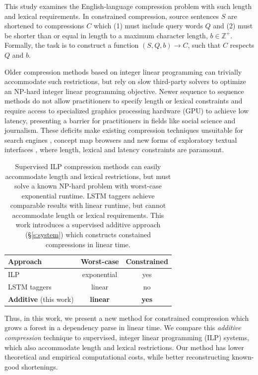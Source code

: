 \documentclass[11pt,a4paper]{article}
\begin{document}
This study examines the English-language compression problem with such length and lexical requirements. In constrained compression, source sentences $S$ are shortened to compressions $C$ which (1) must include query words $Q$ and (2) must be shorter than or equal in length to a maximum character length, $b \in \mathbb{Z}^{+}$. Formally, the task is to construct a function $(S,Q,b) \rightarrow C$, such that $C$ respects $Q$ and $b$.

Older compression methods  \cite{clarke2008global,filippova2013overcoming} based on integer linear programming can trivially accommodate such restrictions, but rely on slow third-party solvers to optimize an NP-hard integer linear programming objective\label{s:relatedwork}. Newer sequence to sequence methods \cite{filippova2015sentence} do not allow practitioners to specify length or lexical constraints and require access to specialized graphics processing hardware (GPU) to achieve low latency, presenting a barrier for practitioners in fields like social science and journalism. These deficits make existing compression techniques unsuitable for search engines \cite{hearst2009search}, concept map browsers \cite{falke2017graphdocexplore} and new forms of exploratory textual interfaces \cite{marchionini2006exploratory}, where length, lexical and latency constraints are paramount. 

\begin{table}[htb!]
\begin{tabular}{lcc}
\textbf{Approach} & \textbf{Worst-case} & \textbf{Constrained}  \\ \hline
ILP       &   exponential    & yes     \\
LSTM taggers   & linear              & no         \\   
\textbf{Additive} {\small (this work)}  & \textbf{linear}     &      \textbf{yes}   
\end{tabular}
\caption{Supervised ILP compression methods \cite{clarke2008global,filippova2013overcoming,Wang2017CanSH} can easily accommodate length and lexical restrictions, but must solve a known NP-hard problem with worst-case exponential runtime. LSTM taggers \cite{filippova2015sentence} achieve comparable results with linear runtime, but cannot accommodate length or lexical requirements. This work introduces a supervised additive approach (\S\ref{s:system}) which constructs constained compressions in linear time.} 
\label{t:algos}
\end{table}

Thus, in this work, we present a new method for constrained compression which grows a forest in a dependency parse in linear time. We compare this \textit{additive compression} technique to supervised, integer linear programming (ILP) systems, which also accommodate length and lexical restrictions. Our method has lower theoretical and empirical computational costs, while better reconstructing known-good shortenings. 
\end{document}
